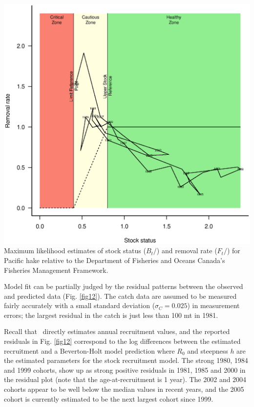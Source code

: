 \begin{multicols}{2}
\begin{figurehere}
	\centering
	\includegraphics[width=0.9\columnwidth]{iscamFigs/phakefig8.eps}\\
	\caption{Maximum likelihood estimates of stock status ($B_t/$\bmsy) and removal rate ($F_t/$\fmsy) for Pacific hake relative to the Department of Fisheries and Oceans Canada's  Fisheries Management Framework.}\label{fig11}
\end{figurehere}

Model fit can be partially judged by the residual patterns between the observed and predicted data (Fig. \ref{fig12}).  The catch data are assumed to be measured fairly accurately with a small standard deviation ($\sigma_C=0.025$) in measurement errors; the largest residual in the catch is just less than 100 mt in 1981.  

Recall that \iscam\ directly estimates annual recruitment values, and the reported residuals in Fig. \ref{fig12} correspond to the log differences between the estimated recruitment and a Beverton-Holt model prediction where $R_0$ and steepness $h$ are the estimated parameters for the stock recruitment model.  The strong 1980, 1984 and 1999 cohorts, show up as strong positive residuals in 1981, 1985 and 2000 in the residual plot (note that the age-at-recruitment is 1 year).  The 2002 and 2004 cohorts appear to be well below the median values in recent years, and the 2005 cohort is currently estimated to be the next largest cohort since 1999.


\end{multicols}

